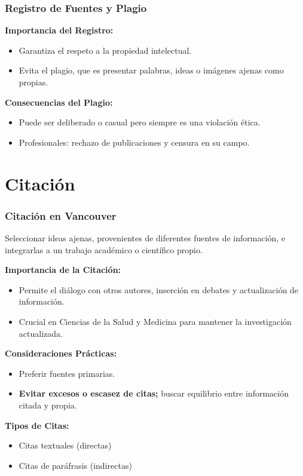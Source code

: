 \documentclass[
11pt, %
]{beamer}
\begin{document}
\begin{frame}
	\frametitle{Registro de Fuentes y Plagio}

	\textbf{Importancia del Registro:}
	\begin{itemize}
		\item Garantiza el respeto a la propiedad intelectual.
		\item Evita el plagio, que es presentar palabras, ideas o imágenes ajenas como propias.
	\end{itemize}

	\textbf{Consecuencias del Plagio:}
	\begin{itemize}
		\item Puede ser deliberado o casual pero siempre es una violación ética.
		\item Profesionales: rechazo de publicaciones y censura en su campo.
	\end{itemize}

\end{frame}

\section{Citación}

\begin{frame}
	\frametitle{Citación en Vancouver}
	Seleccionar ideas ajenas, provenientes de diferentes fuentes de información, e integrarlas a un trabajo académico o científico propio.

	\textbf{Importancia de la Citación:}
	\begin{itemize}
		\item Permite el diálogo con otros autores, inserción en debates y actualización de información.
		\item Crucial en Ciencias de la Salud y Medicina para mantener la investigación actualizada.
	\end{itemize}

	\textbf{Consideraciones Prácticas:}
	\begin{itemize}
		\item Preferir fuentes primarias.
		\item \textbf{Evitar excesos o escasez de citas;} buscar equilibrio entre información citada y propia.
	\end{itemize}

	\textbf{Tipos de Citas:}
	\begin{itemize}
		\item Citas textuales (directas)
		\item Citas de paráfrasis (indirectas)
	\end{itemize}

\end{frame}
\end{document}
